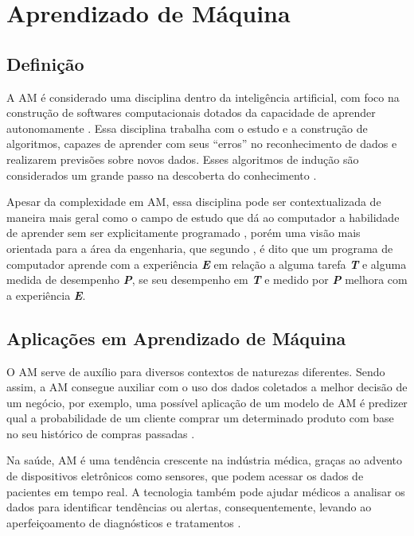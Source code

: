 \chapter{Aprendizado de Máquina}
\section{Definição}
A AM é considerado uma disciplina dentro da inteligência artificial, com foco na construção de softwares computacionais dotados da capacidade de aprender autonomamente \cite{Hosch}. Essa disciplina trabalha com o estudo e a construção de algoritmos, capazes de aprender com seus “erros” no reconhecimento de dados e realizarem previsões sobre novos dados. Esses algoritmos de indução são considerados um grande passo na descoberta do conhecimento \cite{Kohavi}.

Apesar da complexidade em AM, essa disciplina pode ser contextualizada de maneira mais geral como o campo de estudo que dá ao computador a habilidade de aprender sem ser explicitamente programado \cite{Arthur}, porém uma visão mais orientada para a área da engenharia, que segundo , é dito que um programa de computador aprende com a experiência \textbf{\textit{E}} em relação a alguma tarefa \textbf{\textit{T}} e alguma medida de desempenho \textbf{\textit{P}}, se seu desempenho em \textbf{\textit{T}} e medido por \textbf{\textit{P}} melhora com a experiência \textbf{\textit{E}}.

\section{Aplicações em Aprendizado de Máquina}
O AM serve de auxílio para diversos contextos de naturezas diferentes. Sendo assim, a AM consegue auxiliar com o uso dos dados coletados a melhor decisão de um negócio, por exemplo, uma possível aplicação de um modelo de AM é predizer qual a probabilidade de um cliente comprar um determinado produto com base no seu histórico de compras passadas \cite{Amazon}.

Na saúde, AM é uma tendência crescente na indústria médica, graças ao advento de dispositivos eletrônicos como sensores, que podem acessar os dados de pacientes em tempo real. A tecnologia também pode ajudar médicos a analisar os dados para identificar tendências ou alertas, consequentemente, levando ao aperfeiçoamento de diagnósticos e tratamentos \cite{Sas}.

